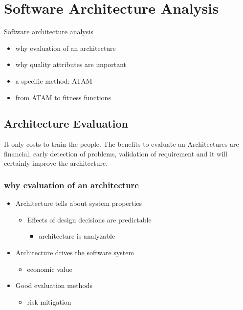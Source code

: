 \hypertarget{software-architecture-analysis}{%
\section{Software Architecture
Analysis}\label{software-architecture-analysis}}

\begin{tcolorbox}[colback=blue!5!white,colframe=blue!75!black]
Software architecture analysis
\begin{itemize}
    \item why evaluation of an architecture
    \item why quality attributes are important
    \item a specific method: ATAM
    \item from ATAM to fitness functions
\end{itemize}
\end{tcolorbox}

\subsection{Architecture Evaluation}
It only costs to train the people. The benefits to evaluate an Architectures are financial, early detection of problems, validation of requirement and it will certainly improve the architecture.


\hypertarget{why-evaluation-of-an-architecture}{%
\subsubsection{why evaluation of an
architecture}\label{why-evaluation-of-an-architecture}}

\begin{itemize}
\tightlist
\item
  Architecture tells about system properties

  \begin{itemize}
  \tightlist
  \item
    Effects of design decisions are predictable

    \begin{itemize}
    \tightlist
    \item
      architecture is analyzable
    \end{itemize}
  \end{itemize}
\item
  Architecture drives the software system

  \begin{itemize}
  \tightlist
  \item
    economic value
  \end{itemize}
\item
  Good evaluation methods

  \begin{itemize}
  \tightlist
  \item
    risk mitigation
  \end{itemize}

\end{itemize}


